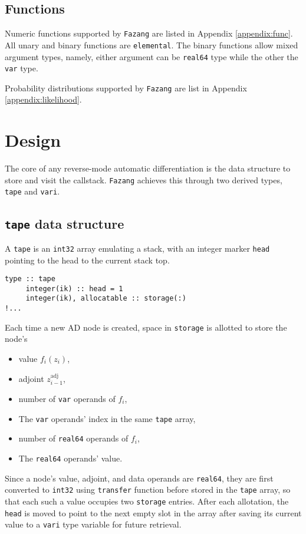 \documentclass[12pt, reqno, oneside]{amsbook}
\numberwithin{equation}{chapter}
\begin{document}
\section{Functions}
\label{sec:org232ca14}
Numeric functions supported by \texttt{Fazang} are listed in Appendix \ref{appendix:func}. All unary and
binary functions are \texttt{elemental}. The binary functions allow mixed
argument types, namely, either argument can be \texttt{real64} type while the
other the \texttt{var} type.

Probability distributions supported by \texttt{Fazang} are list in Appendix \ref{appendix:likelihood}.

\chapter{Design}
\label{sec:orgb732b9f}
The core of any reverse-mode automatic differentiation is the data
structure to store and visit the callstack. \texttt{Fazang} achieves this
through two derived types, \texttt{tape} and \texttt{vari}.

\section{\texttt{tape} data structure}
\label{sec:org21ba8c6}
A \texttt{tape} is an \texttt{int32} array emulating a stack, with an integer marker \texttt{head} pointing to the
head to the current stack top.
\begin{verbatim}
type :: tape
     integer(ik) :: head = 1
     integer(ik), allocatable :: storage(:)
!...
\end{verbatim}
Each time a new AD node is created,
space in \texttt{storage} is allotted to store the node's
\begin{itemize}
\item value \(f_i(z_i)\),
\item adjoint \(z_{i-1}^{\text{adj}}\),
\item number of \texttt{var} operands of \(f_i\),
\item The \texttt{var} operands' index in the same \texttt{tape} array,
\item number of \texttt{real64} operands of \(f_i\),
\item The \texttt{real64} operands' value.
\end{itemize}

Since a node's value, adjoint, and data
operands are \texttt{real64}, they are first converted to \texttt{int32} using
\texttt{transfer} function before stored in the \texttt{tape} array, so that each such
a value occupies two \texttt{storage} entries. After each
allotation, the \texttt{head} is moved to point to the next empty slot in
the array after saving its current value to a \texttt{vari} type variable
for future retrieval.
\end{document}
